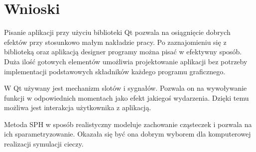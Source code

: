 \section{Wnioski}
Pisanie aplikacji przy użyciu biblioteki \textsf{Qt} pozwala na osiągnięcie dobrych efektów przy stosunkowo małym nakładzie pracy. Po zaznajomieniu się z biblioteką oraz aplikacją \textsf{designer} programy można pisać w efektywny sposób. Duża ilość gotowych elementów umożliwia projektowanie aplikacji bez potrzeby implementacji podstawowych składników każdego programu graficznego.

W \textsf{Qt} używany jest mechanizm slotów i sygnałów. Pozwala on na wywoływanie funkcji w odpowiednich momentach jako efekt jakiegoś wydarzenia. Dzięki temu możliwa jest interakcja użytkownika z aplikacją.

Metoda SPH w sposób realistyczny modeluje zachowanie cząsteczek i pozwala na ich sparametryzowanie. Okazała się być ona dobrym wyborem dla komputerowej realizacji symulacji cieczy.